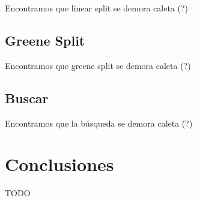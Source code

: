 \documentclass[letterpaper,10pt]{article}
\begin{document}
	Encontramos que linear split se demora caleta (?)

	\subsection{Greene Split}

	Encontramos que greene split se demora caleta (?)

	\subsection{Buscar}

	Encontramos que la búsqueda se demora caleta (?)

	\newpage

	\section{Conclusiones}

	TODO
\end{document}
